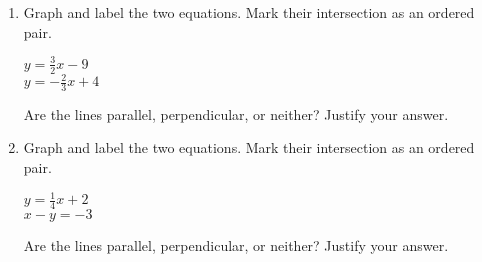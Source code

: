 \documentclass[12pt, twoside]{article}
\begin{document}
\begin{enumerate}
\item Graph and label the two equations. Mark their intersection as an ordered pair.
    \begin{multicols}{2}
      $y = \frac{3}{2}x-9$ \\
      $y = -\frac{2}{3}x+4$
    \end{multicols}     \vspace{2cm}
    Are the lines parallel, perpendicular, or neither? Justify your answer.
    \vspace{2cm}

    \begin{center} %
    \end{center}

\newpage

\item Graph and label the two equations. Mark their intersection as an ordered pair.
    \begin{multicols}{2}
      $y = \frac{1}{4}x+2$ \\
      $x-y = -3$
    \end{multicols}     \vspace{2cm}
    Are the lines parallel, perpendicular, or neither? Justify your answer.
    \vspace{2cm}

    \begin{center} %
    \end{center}

\end{enumerate}
\end{document}
